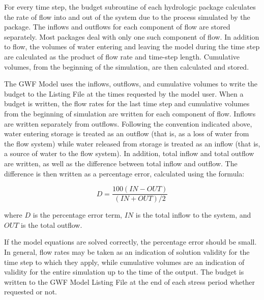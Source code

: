 For every time step, the budget subroutine of each hydrologic package calculates the rate of flow into and out of the system due to the process simulated by the package.  The inflows and outflows for each component of flow are stored separately.  Most packages deal with only one such component of flow.  In addition to flow, the volumes of water entering and leaving the model during the time step are calculated as the product of flow rate and time-step length.  Cumulative volumes, from the beginning of the simulation, are then calculated and stored.

The GWF Model uses the inflows, outflows, and cumulative volumes to write the budget to the Listing File at the times requested by the model user.  When a budget is written, the flow rates for the last time step and cumulative volumes from the beginning of simulation are written for each component of flow.  Inflows are written separately from outflows.  Following the convention indicated above, water entering storage is treated as an outflow (that is, as a loss of water from the flow system) while water released from storage is treated as an inflow (that is, a source of water to the flow system).  In addition, total inflow and total outflow are written, as well as the difference between total inflow and outflow.  The difference is then written as a percentage error, calculated using the formula:

\begin{equation}
D = \frac{100 (IN-OUT)}{(IN + OUT) / 2}
\end{equation}

\noindent where $D$ is the percentage error term, $IN$ is the total inflow to the system, and $OUT$ is the total outflow.

If the model equations are solved correctly, the percentage error should be small.  In general, flow rates may be taken as an indication of solution validity for the time step to which they apply, while cumulative volumes are an indication of validity for the entire simulation up to the time of the output.  The budget is written to the GWF Model Listing File at the end of each stress period whether requested or not.

